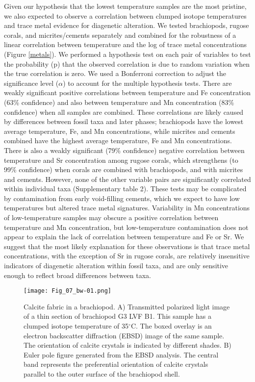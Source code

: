 \documentclass[5p, authoryear]{elsarticle}
\begin{document}
Given our hypothesis that the lowest temperature samples are the most pristine, we also expected to observe a correlation between clumped isotope temperatures and trace metal evidence for diagenetic alteration. We tested brachiopods, rugose corals, and micrites/cements separately and combined for the robustness of a linear correlation between temperature and the log of trace metal concentrations (Figure \ref{metals}). We performed a hypothesis test on each pair of variables to test the probability (p) that the observed correlation is due to random variation when the true correlation is zero. We used a Bonferroni correction to adjust the significance level ($\alpha$) to account for the multiple hypothesis tests. There are weakly significant positive correlations between temperature and Fe concentration (63\% confidence) and also between temperature and Mn concentration (83\% confidence) when all samples are combined. These correlations are likely caused by differences between fossil taxa and later phases; brachiopods have the lowest average temperature, Fe, and Mn concentrations, while micrites and cements combined have the highest average temperature, Fe and Mn concentrations. There is also a weakly significant (79\% confidence) negative correlation between temperature and Sr concentration among rugose corals, which strengthens (to 99\% confidence) when corals are combined with brachiopods, and with micrites and cements. However, none of the other variable pairs are significantly correlated within individual taxa (Supplementary table 2). These tests may be complicated by contamination from early void-filling cements, which we expect to have low temperatures but altered trace metal signatures. Variability in Mn concentrations of low-temperature samples may obscure a positive correlation between temperature and Mn concentration, but low-temperature contamination does not appear to explain the lack of correlation between temperature and Fe or Sr. We suggest that the most likely explanation for these observations is that trace metal concentrations, with the exception of Sr in rugose corals, are relatively insensitive indicators of diagenetic alteration within fossil taxa, and are only sensitive enough to reflect broad differences between taxa. 

\begin{figure*}[tb]
\centering
\texttt{[image: Fig\_07\_bw-01.png]}
\caption{Calcite fabric in a brachiopod. A) Transmitted polarized light image of a thin section of brachiopod G3 LVF B1. This sample has a clumped isotope temperature of 35$^{\circ}$C. The boxed overlay is an electron backscatter diffraction (EBSD) image of the same sample. The orientation of calcite crystals is indicated by different shades. B) Euler pole figure generated from the EBSD analysis. The central band represents the preferential orientation of calcite crystals parallel to the outer surface of the brachiopod shell.}
\label{EBSD_brach}
\end{figure*}
\end{document}
